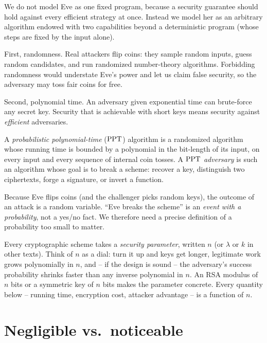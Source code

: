 We do not model Eve as one fixed program, because a security guarantee should hold against every efficient strategy at once. Instead we model her as an arbitrary algorithm endowed with two capabilities beyond a deterministic program (whose steps are fixed by the input alone).

First, randomness. Real attackers flip coins: they sample random inputs, guess random candidates, and run randomized number-theory algorithms. Forbidding randomness would understate Eve's power and let us claim false security, so the adversary may toss fair coins for free.

Second, polynomial time. An adversary given exponential time can brute-force any secret key. Security that is achievable with short keys means security against \emph{efficient} adversaries.

\begin{definition}
\label{ch08:def-ppt}
A \emph{probabilistic polynomial-time} ($\mathrm{PPT}$) algorithm is a randomized algorithm whose running time is bounded by a polynomial in the bit-length of its input, on every input and every sequence of internal coin tosses. A $\mathrm{PPT}$ \emph{adversary} is such an algorithm whose goal is to break a scheme: recover a key, distinguish two ciphertexts, forge a signature, or invert a function.
\end{definition}

Because Eve flips coins (and the challenger picks random keys), the outcome of an attack is a random variable. ``Eve breaks the scheme'' is an \emph{event with a probability}, not a yes/no fact. We therefore need a precise definition of a probability too small to matter.

\begin{focusbox}
Every cryptographic scheme takes a \emph{security parameter}, written $n$ (or $\lambda$ or $k$ in other texts). Think of $n$ as a dial: turn it up and keys get longer, legitimate work grows polynomially in $n$, and -- if the design is sound -- the adversary's success probability shrinks faster than any inverse polynomial in $n$. An RSA modulus of $n$ bits or a symmetric key of $n$ bits makes the parameter concrete. Every quantity below -- running time, encryption cost, attacker advantage -- is a function of $n$.
\end{focusbox}

\section{Negligible vs.\ noticeable}
\label{ch08:negligible}

